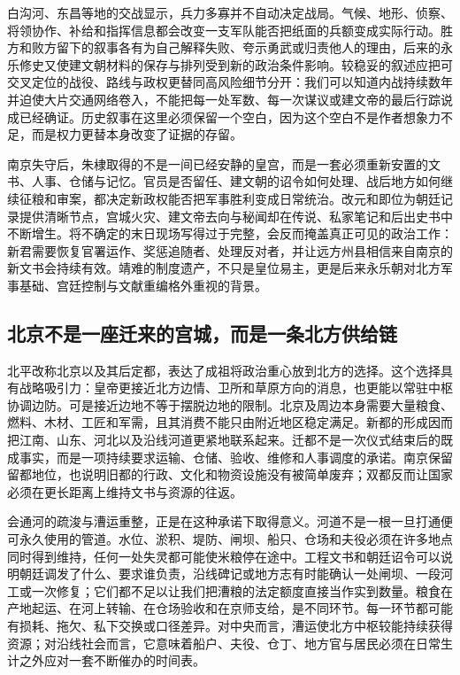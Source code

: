 白沟河、东昌等地的交战显示，兵力多寡并不自动决定战局。气候、地形、侦察、将领协作、补给和指挥信息都会改变一支军队能否把纸面的兵额变成实际行动。胜方和败方留下的叙事各有为自己解释失败、夸示勇武或归责他人的理由，后来的永乐修史又使建文朝材料的保存与排列受到新的政治条件影响。较稳妥的叙述应把可交叉定位的战役、路线与政权更替同高风险细节分开：我们可以知道内战持续数年并迫使大片交通网络卷入，不能把每一处军数、每一次谋议或建文帝的最后行踪说成已经确证。历史叙事在这里必须保留一个空白，因为这个空白不是作者想象力不足，而是权力更替本身改变了证据的存留。

南京失守后，朱棣取得的不是一间已经安静的皇宫，而是一套必须重新安置的文书、人事、仓储与记忆。官员是否留任、建文朝的诏令如何处理、战后地方如何继续征粮和审案，都决定新政权能否把军事胜利变成日常统治。改元和即位为朝廷记录提供清晰节点，宫城火灾、建文帝去向与秘闻却在传说、私家笔记和后出史书中不断增生。将不确定的末日现场写得过于完整，会反而掩盖真正可见的政治工作：新君需要恢复官署运作、奖惩追随者、处理反对者，并让远方州县相信来自南京的新文书会持续有效。靖难的制度遗产，不只是皇位易主，更是后来永乐朝对北方军事基础、宫廷控制与文献重编格外重视的背景。

\subsection{北京不是一座迁来的宫城，而是一条北方供给链}

北平改称北京以及其后定都，表达了成祖将政治重心放到北方的选择。这个选择具有战略吸引力：皇帝更接近北方边情、卫所和草原方向的消息，也更能以常驻中枢协调边防。可是接近边地不等于摆脱边地的限制。北京及周边本身需要大量粮食、燃料、木材、工匠和军需，且其消费不能只由附近地区稳定满足。新都的形成因而把江南、山东、河北以及沿线河道更紧地联系起来。迁都不是一次仪式结束后的既成事实，而是一项持续要求运输、仓储、验收、维修和人事调度的承诺。南京保留留都地位，也说明旧都的行政、文化和物资设施没有被简单废弃；双都反而让国家必须在更长距离上维持文书与资源的往返。

会通河的疏浚与漕运重整，正是在这种承诺下取得意义。河道不是一根一旦打通便可永久使用的管道。水位、淤积、堤防、闸坝、船只、仓场和夫役必须在许多地点同时得到维持，任何一处失灵都可能使米粮停在途中。工程文书和朝廷诏令可以说明朝廷调发了什么、要求谁负责，沿线碑记或地方志有时能确认一处闸坝、一段河工或一次修复；它们都不足以让我们把漕粮的法定额度直接当作实到数量。粮食在产地起运、在河上转输、在仓场验收和在京师支给，是不同环节。每一环节都可能有损耗、拖欠、私下交换或口径差异。对中央而言，漕运使北方中枢较能持续获得资源；对沿线社会而言，它意味着船户、夫役、仓丁、地方官与居民必须在日常生计之外应对一套不断催办的时间表。


